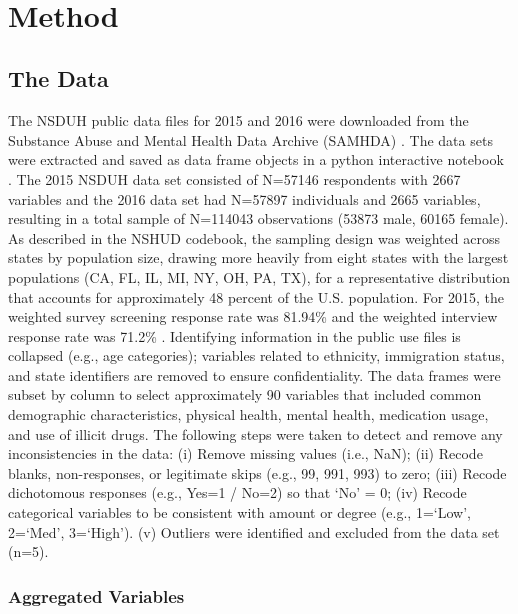 \\\documentclass[sigconf]{acmart}
\begin{document}
\section{Method}

\subsection{The Data}

The NSDUH public data files for 2015 and 2016 were downloaded from the 
Substance Abuse and Mental Health Data Archive (SAMHDA) \cite{samhsa18}. 
The data sets were extracted and saved as data frame objects in a python 
interactive notebook \cite{mckinney17, vanderplas17}. The 2015 NSDUH data set 
consisted of N=57146 respondents with 2667 variables and the 2016 data set had 
N=57897 individuals and 2665 variables, resulting in a total sample of N=114043 
observations (53873 male, 60165 female). As described in the NSHUD codebook, 
the sampling design was weighted across states by population size, drawing more 
heavily from eight states with the largest populations (CA, FL, IL, MI, NY, OH, 
PA, TX), for a representative distribution that accounts for approximately 
48 percent of the U.S. population. For 2015, the weighted survey screening 
response rate  was 81.94\% and the weighted interview response rate was 71.2\% 
\cite{samhsa18}. Identifying information in the public use files is collapsed 
(e.g., age categories); variables related to ethnicity, immigration status, and 
state identifiers are removed to ensure confidentiality. The data frames were 
subset by column to select approximately 90 variables that included common 
demographic characteristics, physical health, mental health, medication usage, 
and use of illicit drugs. The following steps were taken to detect and remove 
any inconsistencies in the data: (i) Remove missing values (i.e., NaN); 
(ii) Recode blanks, non-responses, or legitimate skips (e.g., 99, 991, 993) to 
zero; (iii) Recode dichotomous responses (e.g., Yes=1 / No=2) so that 
`No' = 0; (iv) Recode categorical variables to be consistent with amount or 
degree  (e.g., 1=`Low', 2=`Med', 3=`High'). (v) Outliers were identified 
and excluded from the data set (n=5).


\subsubsection{Aggregated Variables}
\end{document}
